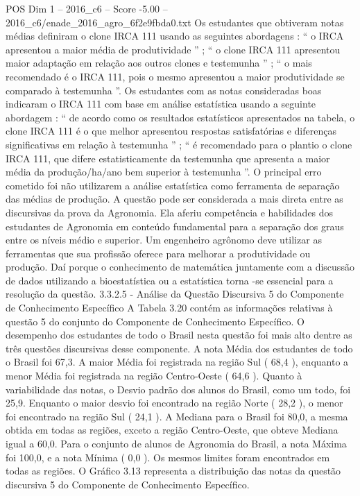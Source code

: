 \begin{textsample}{POS Dim 1 – 2016\_c6 – Score -5.00 – 2016\_c6/enade\_2016\_agro\_6f2e9fbda0.txt}
Os estudantes que obtiveram notas médias definiram o clone IRCA 111 usando as seguintes abordagens : “ o IRCA apresentou a maior média de produtividade ” ; “ o clone IRCA 111 apresentou maior adaptação em relação aos outros clones e testemunha ” ; “ o mais recomendado é o IRCA 111, pois o mesmo apresentou a maior produtividade se comparado à testemunha ”.
Os estudantes com as notas consideradas boas indicaram o IRCA 111 com base em análise estatística usando a seguinte abordagem : “ de acordo como os resultados estatísticos apresentados na tabela, o clone IRCA 111 é o que melhor apresentou respostas satisfatórias e diferenças significativas em relação à testemunha ” ; “ é recomendado para o plantio o clone IRCA 111, que difere estatisticamente da testemunha que apresenta a maior média da produção/ha/ano bem superior à testemunha ”.
O principal erro cometido foi não utilizarem a análise estatística como ferramenta de separação das médias de produção.
A questão pode ser considerada a mais direta entre as discursivas da prova da Agronomia.
Ela aferiu competência e habilidades dos estudantes de Agronomia em conteúdo fundamental para a separação dos graus entre os níveis médio e superior.
Um engenheiro agrônomo deve utilizar as ferramentas que sua profissão oferece para melhorar a produtividade ou produção.
Daí porque o conhecimento de matemática juntamente com a discussão de dados utilizando a bioestatística ou a estatística torna -se essencial para a resolução da questão. 3.3.2.5 - Análise da Questão Discursiva 5 do Componente de Conhecimento Específico A Tabela 3.20 contém as informações relativas à questão 5 do conjunto do Componente de Conhecimento Específico.
O desempenho dos estudantes de todo o Brasil nesta questão foi mais alto dentre as três questões discursivas desse componente.
A nota Média dos estudantes de todo o Brasil foi 67,3.
A maior Média foi registrada na região Sul ( 68,4 ), enquanto a menor Média foi registrada na região Centro-Oeste ( 64,6 ).
Quanto à variabilidade das notas, o Desvio padrão dos alunos do Brasil, como um todo, foi 25,9.
Enquanto o maior desvio foi encontrado na região Norte ( 28,2 ), o menor foi encontrado na região Sul ( 24,1 ).
A Mediana para o Brasil foi 80,0, a mesma obtida em todas as regiões, exceto a região Centro-Oeste, que obteve Mediana igual a 60,0.
Para o conjunto de alunos de Agronomia do Brasil, a nota Máxima foi 100,0, e a nota Mínima ( 0,0 ).
Os mesmos limites foram encontrados em todas as regiões.
O Gráfico 3.13 representa a distribuição das notas da questão discursiva 5 do Componente de Conhecimento Específico.

\end{textsample}
